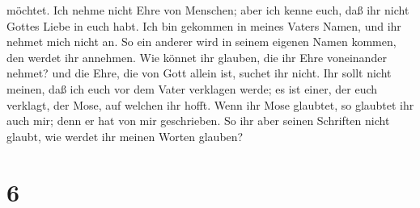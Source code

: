 möchtet.  Ich nehme nicht Ehre von Menschen; 
aber ich kenne euch, daß ihr nicht Gottes Liebe in euch habt.
 Ich bin gekommen in meines Vaters Namen, und ihr nehmet
mich nicht an. So ein anderer wird in seinem eigenen Namen kommen, den
werdet ihr annehmen.  Wie könnet ihr glauben, die ihr Ehre
voneinander nehmet? und die Ehre, die von Gott allein ist, suchet ihr
nicht.  Ihr sollt nicht meinen, daß ich euch vor dem Vater
verklagen werde; es ist einer, der euch verklagt, der Mose, auf welchen
ihr hofft.  Wenn ihr Mose glaubtet, so glaubtet ihr auch
mir; denn er hat von mir geschrieben.  So ihr aber seinen
Schriften nicht glaubt, wie werdet ihr meinen Worten glauben?

\hypertarget{section-5}{%
\section{6}\label{section-5}}

